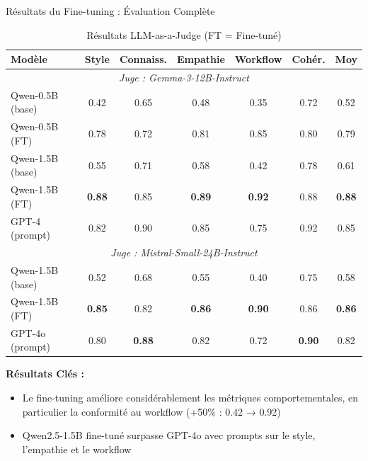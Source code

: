 \documentclass[11pt, aspectratio=169, xcolor=table]{beamer}
\begin{document}
\begin{frame}{Résultats du Fine-tuning : Évaluation Complète}
    \begin{table}[H]
        \centering
        \caption{Résultats LLM-as-a-Judge (FT = Fine-tuné)}
        \tiny
        \begin{tabular}{|l|c|c|c|c|c|c|}
            \hline
            \textbf{Modèle} & \textbf{Style} & \textbf{Connaiss.} & \textbf{Empathie} & \textbf{Workflow} & \textbf{Cohér.} & \textbf{Moy} \\
            \hline
            \multicolumn{7}{|c|}{\textit{Juge : Gemma-3-12B-Instruct}} \\
            \hline
            Qwen-0.5B (base) & 0.42 & 0.65 & 0.48 & 0.35 & 0.72 & 0.52 \\
            Qwen-0.5B (FT) & 0.78 & 0.72 & 0.81 & 0.85 & 0.80 & 0.79 \\
            Qwen-1.5B (base) & 0.55 & 0.71 & 0.58 & 0.42 & 0.78 & 0.61 \\
            \rowcolor{gray!20}
            Qwen-1.5B (FT) & \textbf{0.88} & 0.85 & \textbf{0.89} & \textbf{0.92} & 0.88 & \textbf{0.88} \\
            GPT-4 (prompt) & 0.82 & 0.90 & 0.85 & 0.75 & 0.92 & 0.85 \\
            \hline
            \multicolumn{7}{|c|}{\textit{Juge : Mistral-Small-24B-Instruct}} \\
            \hline
            Qwen-1.5B (base) & 0.52 & 0.68 & 0.55 & 0.40 & 0.75 & 0.58 \\
            \rowcolor{gray!20}
            Qwen-1.5B (FT) & \textbf{0.85} & 0.82 & \textbf{0.86} & \textbf{0.90} & 0.86 & \textbf{0.86} \\
            GPT-4o (prompt) & 0.80 & \textbf{0.88} & 0.82 & 0.72 & \textbf{0.90} & 0.82 \\
            \hline
        \end{tabular}
    \end{table}
    
    \textbf{Résultats Clés :}
    \begin{itemize}
        \item Le fine-tuning améliore considérablement les métriques comportementales, en particulier la conformité au workflow (+50\% : 0.42 → 0.92)
        \item Qwen2.5-1.5B fine-tuné surpasse GPT-4o avec prompts sur le style, l'empathie et le workflow
    \end{itemize}
\end{frame}
\end{document}
